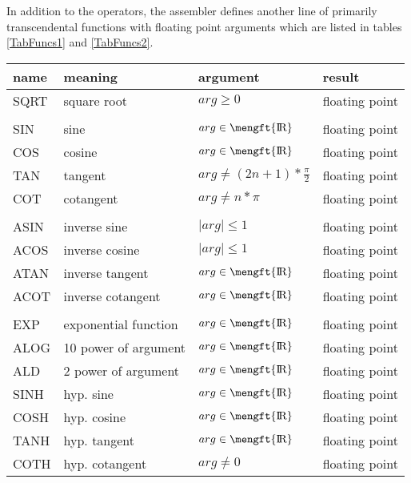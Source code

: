\documentclass[12pt,twoside]{report}
\def \rz{\hbox{\mengft{I \hskip -1.7mm R}}}
\begin{document}
In addition to the operators, the assembler defines another line of
primarily transcendental functions with floating point arguments which are
listed in tables \ref{TabFuncs1} and \ref{TabFuncs2}.
\begin{table*}[htbp]
\begin{center}\begin{tabular}{|l|l|l|l|}
\hline
name     & meaning              & argument             & result \\
\hline
\hline
SQRT     & square root          & $arg \geq 0$         & floating point \\
         &                      &                      & \\
SIN      & sine                 & $arg \in \rz$        & floating point \\
COS      & cosine               & $arg \in \rz$        & floating point \\
TAN      & tangent              & $arg \neq (2n+1)*\frac{\pi}{2}$ & floating point \\
COT      & cotangent            & $arg \neq n*\pi$     & floating point \\
         &                      &                      & \\
ASIN     & inverse sine         & $\mid arg \mid \leq 1$ & floating point \\
ACOS     & inverse cosine       & $\mid arg \mid \leq 1$ & floating point \\
ATAN     & inverse tangent      & $arg \in \rz$        & floating point \\
ACOT     & inverse cotangent    & $arg \in \rz$        & floating point \\
         &                      &                      & \\
EXP      & exponential function & $arg \in \rz$        & floating point \\
ALOG     & 10 power of argument & $arg \in \rz$        & floating point \\
ALD      & 2 power of argument  & $arg \in \rz$        & floating point \\
SINH     & hyp. sine            & $arg \in \rz$        & floating point \\
COSH     & hyp. cosine          & $arg \in \rz$        & floating point \\
TANH     & hyp. tangent         & $arg \in \rz$        & floating point \\
COTH     & hyp. cotangent       & $arg \neq 0$         & floating point \\

\end{tabular}
\end{center}
\end{table*}
\end{document}
